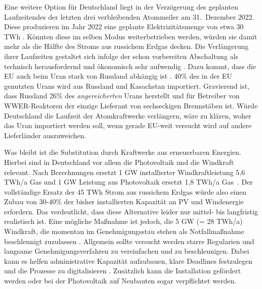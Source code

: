 Eine weitere Option für Deutschland liegt in der Verzögerung des geplanten Laufzeitendes der letzten drei verbleibenden Atommeiler am 31.~Dezember 2022. Diese produzieren im Jahr 2022 eine geplante Elektrizitätsmenge von etwa 30 TWh \cite{kernkraftwerke-rest}. Könnten diese im selben Modus weiterbetrieben werden, würden sie damit mehr als die Hälfte des Stroms aus russichem Erdgas decken. Die Verlängerung ihrer Laufzeiten gestaltet sich infolge der schon vorbereiten Abschaltung als technisch herausfordernd und ökonomisch sehr aufwendig \cite{leo}. Dazu kommt, dass die EU auch beim Uran stark von Russland abhängig ist \cite{spiegel-uran}. 40\% des in der EU genutzten Urans wird aus Russland und Kasachstan importiert. Gravierend ist, dass Russland 26\% des \textit{angereicherten} Urans herstellt und für Betreiber von WWER-Reaktoren der einzige Lieferant von sechseckigen Brennstäben ist.
Würde Deutschland die Laufzeit der Atomkraftwerke verlängern, wäre zu klären, woher das Uran importiert werden soll, wenn gerade EU-weit versucht wird auf andere Lieferländer auszuweichen.

Was bleibt ist die Substitution durch Kraftwerke aus erneuerbaren Energien. Hierbei sind in Deutschland vor allem die Photovoltaik und die Windkraft relevant. Nach Berechnungen ersetzt 1 GW installierter Windkraftleistung 5,6 TWh/a Gas und 1 GW Leistung aus Photovoltaik ersetzt 1,8 TWh/a Gas~\cite{clausen2022}. Der vollständige Ersatz der 45 TWh Strom aus russichem Erdgas würde also einen Zubau von 30-40\% der bisher installierten Kapazität an PV und Windenergie erfordern. Das verdeutlicht, dass diese Alternative leider nur mittel- bis langfristig realistisch ist. Eine mögliche Maßnahme ist jedoch, die 5 GW (= 28 TWh/a) Windkraft, die momentan im Genehmigungsstau stehen als Notfallmaßnahme beschleunigt zuzulassen \cite{clausen2022}. Allgemein sollte versucht werden starre Regularien und langsame Genehmigungsverfahren zu vereinfachen und zu beschleunigen. Dabei kann es helfen administrative Kapazität aufzubauen, klare Deadlines festzulegen und die Prozesse zu digitalisieren \cite{iea2022}. Zusätzlich kann die Installation gefördert werden oder bei der Photovoltaik auf Neubauten sogar verpflichtet werden.

